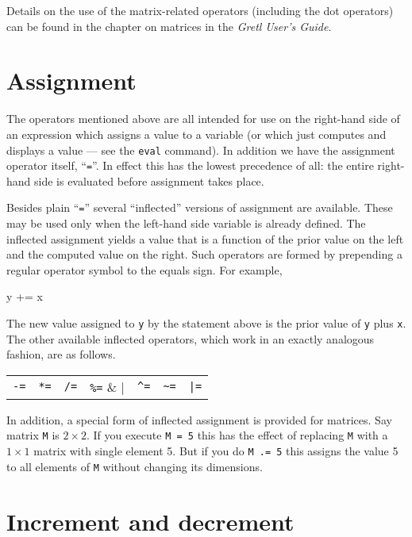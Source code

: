 Details on the use of the matrix-related operators (including the dot
operators) can be found in the chapter on matrices in the
\textit{Gretl User's Guide}.

\section{Assignment}

The operators mentioned above are all intended for use on the
right-hand side of an expression which assigns a value to a variable
(or which just computes and displays a value --- see the \texttt{eval}
command). In addition we have the assignment operator itself,
``\texttt{=}''. In effect this has the lowest precedence of all: the
entire right-hand side is evaluated before assignment takes place.

Besides plain ``\texttt{=}'' several ``inflected'' versions of
assignment are available. These may be used only when the left-hand
side variable is already defined. The inflected assignment yields a
value that is a function of the prior value on the left and the
computed value on the right. Such operators are formed by prepending a
regular operator symbol to the equals sign. For example,
%
\begin{code}
y += x
\end{code}
%
The new value assigned to \texttt{y} by the statement above is the
prior value of \texttt{y} plus \texttt{x}. The other available
inflected operators, which work in an exactly analogous fashion, are
as follows.

\begin{center}
\begin{tabular}{ccccccc}
\texttt{-=} & \texttt{*=} & \texttt{/=} & \verb|%=| & 
  \verb|^=| & \verb|~=| & \verb+|=+ \\
\end{tabular}
\end{center}

In addition, a special form of inflected assignment is provided for
matrices. Say matrix \texttt{M} is $2 \times 2$. If you execute
\texttt{M = 5} this has the effect of replacing \texttt{M} with a $1
\times 1$ matrix with single element 5. But if you do \texttt{M .= 5}
this assigns the value 5 to all elements of \texttt{M} without
changing its dimensions.

\section{Increment and decrement}

